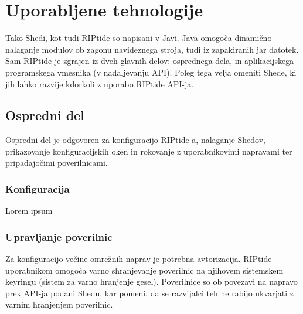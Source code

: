 \documentclass[12pt]{article}
\begin{document}
\section{Uporabljene tehnologije}
Tako Shedi, kot tudi RIPtide so napisani v Javi. Java omogoča dinamično nalaganje modulov ob zagonu navideznega stroja, tudi iz zapakiranih jar datotek. Sam RIPtide je zgrajen iz dveh glavnih delov: osprednega dela, in aplikacijskega programskega vmesnika (v nadaljevanju API). Poleg tega velja omeniti Shede, ki jih lahko razvije kdorkoli z uporabo RIPtide API-ja.

\subsection{Ospredni del}
Ospredni del je odgovoren za konfiguracijo RIPtide-a, nalaganje Shedov, prikazovanje konfiguracijskih oken in rokovanje z uporabnikovimi napravami ter pripadajočimi poverilnicami.

\subsubsection{Konfiguracija}
Lorem ipsum

\subsubsection{Upravljanje poverilnic}
Za konfiguracijo večine omrežnih naprav je potrebna avtorizacija. RIPtide uporabnikom omogoča varno shranjevanje poverilnic na njihovem sistemskem keyringu (sistem za varno hranjenje gesel). Poverilnice so ob povezavi na napravo prek API-ja podani Shedu, kar pomeni, da se razvijalci teh ne rabijo ukvarjati z varnim hranjenjem poverilnic.

\newpage
\end{document}
